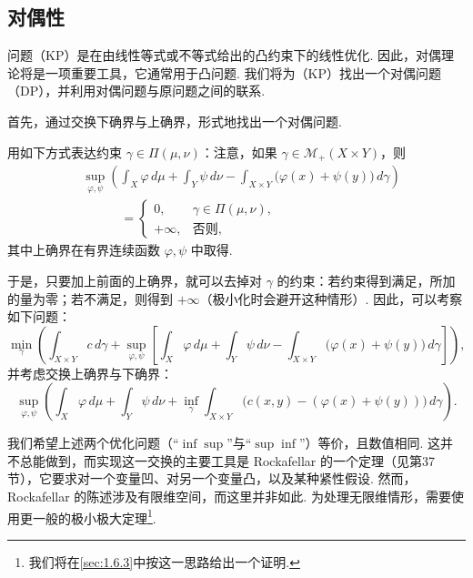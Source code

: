 \subsection{对偶性}\label{sec:1.2}

问题（KP）是在由线性等式或不等式给出的凸约束下的线性优化. 因此，对偶理论将是一项重要工具，它通常用于凸问题. 我们将为（KP）找出一个对偶问题（DP），并利用对偶问题与原问题之间的联系.

首先，通过交换下确界与上确界，形式地找出一个对偶问题.

用如下方式表达约束 $\gamma\in\Pi(\mu,\nu)$：注意，如果 $\gamma\in\mathscr M_+(X\times Y)$，则
\begin{equation*}
\begin{aligned}
&\sup_{\varphi,\psi}\left(\int_X\varphi\,d\mu+\int_Y\psi\,d\nu
-\int_{X\times Y}\bigl(\varphi(x)+\psi(y)\bigr)\,d\gamma\right)\\
&\hspace{3em}=\begin{cases}
0,&\gamma\in\Pi(\mu,\nu),\\
+\infty,&\text{否则},
\end{cases}
\end{aligned}
\end{equation*}
其中上确界在有界连续函数 $\varphi,\psi$ 中取得.

于是，只要加上前面的上确界，就可以去掉对 $\gamma$ 的约束：若约束得到满足，所加的量为零；若不满足，则得到 $+\infty$（极小化时会避开这种情形）. 因此，可以考察如下问题：
\begin{equation}\label{eq:1.3}
\min_\gamma\left(\int_{X\times Y}c\,d\gamma+
\sup_{\varphi,\psi}\left[\int_X\varphi\,d\mu+\int_Y\psi\,d\nu
-\int_{X\times Y}\bigl(\varphi(x)+\psi(y)\bigr)\,d\gamma\right]\right),
\end{equation}
并考虑交换上确界与下确界：
\begin{equation*}
\sup_{\varphi,\psi}\left(\int_X\varphi\,d\mu+\int_Y\psi\,d\nu+
\inf_\gamma\int_{X\times Y}\bigl(c(x,y)-(\varphi(x)+\psi(y))\bigr)\,d\gamma\right).
\end{equation*}

我们希望上述两个优化问题（“$\inf\sup$”与“$\sup\inf$”）等价，且数值相同. 这并不总能做到，而实现这一交换的主要工具是 Rockafellar 的一个定理（见\cite{b260}第37节），它要求对一个变量凹、对另一个变量凸，以及某种紧性假设. 然而，Rockafellar 的陈述涉及有限维空间，而这里并非如此. 为处理无限维情形，需要使用更一般的极小极大定理\footnote{我们将在\autoref{sec:1.6.3}中按这一思路给出一个证明.}.

